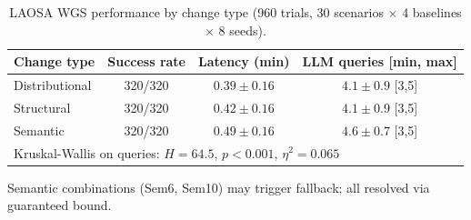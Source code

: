 \begin{table}[h]
\centering
\caption{LAOSA WGS performance by change type (960 trials, 30 scenarios $\times$ 4 baselines $\times$ 8 seeds).}
\label{tab:wgs_q1_bytype}
\small
\begin{threeparttable}
\begin{tabular}{@{}lccc@{}}
\toprule
Change type & Success rate & Latency (min) & LLM queries [min, max] \\
\midrule
Distributional & 320/320 & $0.39\pm0.16$ & $4.1\pm0.9$ [3,5] \\
Structural & 320/320 & $0.42\pm0.16$ & $4.1\pm0.9$ [3,5] \\
Semantic & 320/320 & $0.49\pm0.16$ & $4.6\pm0.7$ [3,5]\tnote{a} \\
\midrule
\multicolumn{4}{l}{\footnotesize Kruskal-Wallis on queries: $H=64.5$, $p<0.001$, $\eta^2=0.065$} \\
\bottomrule
\end{tabular}
\begin{tablenotes}\footnotesize
\item[a] Semantic combinations (Sem6, Sem10) may trigger fallback; all resolved via guaranteed bound.
\end{tablenotes}
\end{threeparttable}
\end{table}
